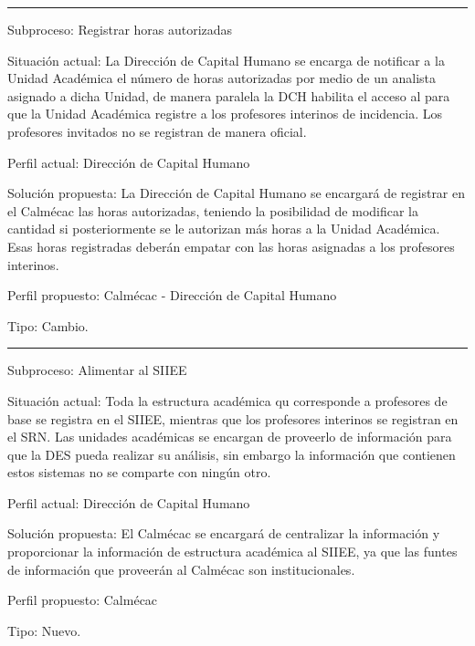 \hrule
\vspace{0.2cm}
\begin{Cdescription}
	\item[Subproceso:] Registrar horas autorizadas
	\item[Situación actual:] La Dirección de Capital Humano se encarga de notificar a la Unidad Académica el número de horas autorizadas por medio de un analista asignado a dicha Unidad, de manera paralela la DCH habilita el acceso al  para que la Unidad Académica registre a los profesores interinos de incidencia. Los profesores invitados no se registran de manera oficial.
	\item[Perfil actual:] Dirección de Capital Humano
	\item[Solución propuesta:] La Dirección de Capital Humano se encargará de registrar en el Calmécac las horas autorizadas, teniendo la posibilidad de modificar la cantidad si posteriormente se le autorizan más horas a la Unidad Académica. Esas horas registradas deberán empatar con las horas asignadas a los profesores interinos.
	\item[Perfil propuesto:] Calmécac - Dirección de Capital Humano
	\item[Tipo:] Cambio.
\end{Cdescription}

\hrule
\vspace{0.2cm}
\begin{Cdescription}
	\item[Subproceso:] Alimentar al SIIEE
	\item[Situación actual:] Toda la estructura académica qu corresponde a profesores de base se registra en el SIIEE, mientras que los profesores interinos se registran en el SRN. Las unidades académicas se encargan de proveerlo de información para que la DES pueda realizar su análisis, sin embargo la información que contienen estos sistemas no se comparte con ningún otro.
	\item[Perfil actual:] Dirección de Capital Humano
	\item[Solución propuesta:] El Calmécac se encargará de centralizar la información y proporcionar la información de estructura académica al SIIEE, ya que las funtes de información que proveerán al Calmécac son institucionales.
	\item[Perfil propuesto:] Calmécac
	\item[Tipo:] Nuevo.
\end{Cdescription}

